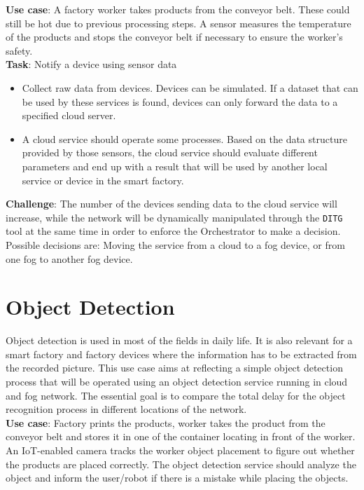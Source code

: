 \textbf{Use case}:
A factory worker takes products from the conveyor belt.
These could still be hot due to previous processing steps.
A sensor measures the temperature of the products and stops the conveyor belt if necessary to ensure the worker's safety.\\

\textbf{Task}: Notify a device using sensor data
\begin{itemize}
    \item Collect raw data from devices. Devices can be simulated. If a dataset that can be used by these services is found, devices can only forward the data to a specified cloud server.
    \item A cloud service should operate some processes. Based on the data structure provided by those sensors, the cloud service should evaluate different parameters and end up with a result that will be used by another local service or device in the smart factory.\\
\end{itemize}

\textbf{Challenge}: The number of the devices sending data to the cloud service will increase, while the network will be dynamically manipulated through the \texttt{DITG} tool at the same time in order to enforce the Orchestrator to make a decision.
Possible decisions are: Moving the service from a cloud to a fog device, or from one fog to another fog device.

\section{Object Detection}
Object detection is used in most of the fields in daily life.
It is also relevant for a smart factory and factory devices where the information has to be extracted from the recorded picture.
This use case aims at reflecting a simple object detection process that will be operated using an object detection service running in cloud and fog network.
The essential goal is to compare the total delay for the object recognition process in different locations of the network.\\

\textbf{Use case}: Factory prints the products, worker takes the product from the conveyor belt and stores it in one of the container locating in front of the worker.
An IoT-enabled camera tracks the worker object placement to figure out whether the products are placed correctly.
The object detection service should analyze the object and inform the user/robot if there is a mistake while placing the objects.\\

